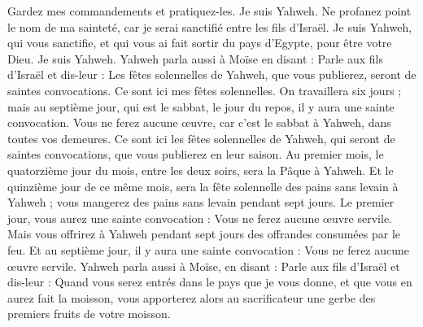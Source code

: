 \begin{multicols}{2}
Gardez mes commandements et pratiquez-les. Je suis Yahweh.
Ne profanez point le nom de ma sainteté, car je serai sanctifié entre les fils d'Israël. Je suis Yahweh, qui vous sanctifie,
et qui vous ai fait sortir du pays d'Egypte, pour être votre Dieu. Je suis Yahweh.
\VerseOne{}Yahweh parla aussi à Moïse en disant :
Parle aux fils d'Israël et dis-leur : Les fêtes solennelles de Yahweh, que vous publierez, seront de saintes convocations. Ce sont ici mes fêtes solennelles.
On travaillera six jours ; mais au septième jour, qui est le sabbat, le jour du repos, il y aura une sainte convocation. Vous ne ferez aucune œuvre, car c'est le sabbat à Yahweh, dans toutes vos demeures.
\TextTitle{[La Pâque]}
Ce sont ici les fêtes solennelles de Yahweh, qui seront de saintes convocations, que vous publierez en leur saison.
Au premier mois, le quatorzième jour du mois, entre les deux soirs, sera la Pâque à Yahweh.
Et le quinzième jour de ce même mois, sera la fête solennelle des pains sans levain à Yahweh ; vous mangerez des pains sans levain pendant sept jours.
Le premier jour, vous aurez une sainte convocation : Vous ne ferez aucune œuvre servile.
Mais vous offrirez à Yahweh pendant sept jours des offrandes consumées par le feu. Et au septième jour, il y aura une sainte convocation : Vous ne ferez aucune œuvre servile.
Yahweh parla aussi à Moïse, en disant :
Parle aux fils d'Israël et dis-leur : Quand vous serez entrés dans le pays que je vous donne, et que vous en aurez fait la moisson, vous apporterez alors au sacrificateur une gerbe des premiers fruits de votre moisson.

\end{multicols}
